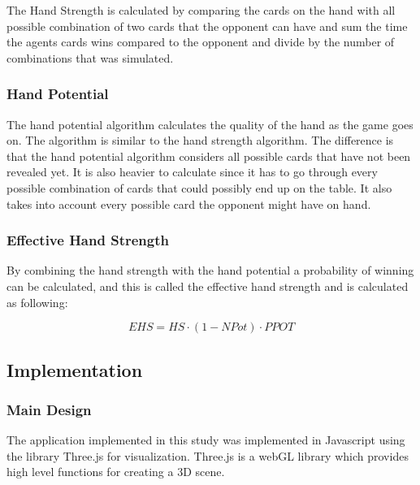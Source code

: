 \documentclass[journal]{vgtc}                %
\begin{document}
The Hand Strength is calculated by comparing the cards on the hand with all possible combination of two cards that the opponent can have and sum the time the agents cards wins compared to the opponent and divide by the number of combinations that was simulated.

\subsubsection{Hand Potential}
The hand potential algorithm calculates the quality of the hand as the game goes on. The algorithm is similar to the hand strength algorithm. The difference is that the hand potential algorithm considers all possible cards that have not been revealed yet. It is also heavier to calculate since it has to go through every possible combination of cards that could possibly end up on the table. It also takes into account every possible card the opponent might have on hand.

\subsubsection{Effective Hand Strength}
By combining the hand strength with the hand potential a probability of winning can be calculated, and this is called the effective hand strength and is calculated as following:

\begin{equation} \label{EHS}
	EHS = HS \cdot (1-NPot) \cdot PPOT
\end{equation}

\subsection{Implementation}
\subsubsection{Main Design}
The application implemented in this study was implemented in Javascript using the library Three.js for visualization. Three.js is a webGL library which provides high level functions for creating a 3D scene.
\end{document}
